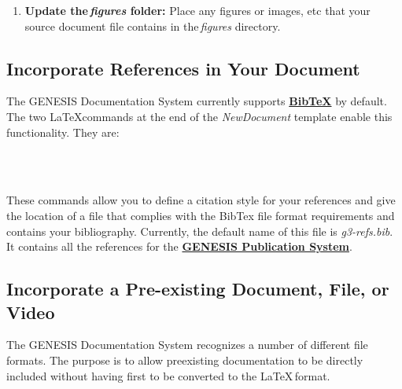 \documentclass[12pt]{article}
\begin{document}
\begin{enumerate}
\begin{enumerate}
Other useful tags include:
\begin{verbatim}
    - genesis2
    - genesis3
    - level1
    - level2
    - level3
    - level4
    - level5
    - level6
    - level7
    - wiki
    - create
    - introduction
    - tutorial
    - document
\end{verbatim}

{\bf Note:} User supplied tags not recognized by the documentation build system may still be useful for local control and sorting of documentation. Importantly, when adding your own tags remember that the interpretation of the\,{\it descriptor.yml} file by the GENESIS Documentation System is sensitive to white space and indents.
 
\end{enumerate}

\item[]{\bf Update the\,{\it figures} folder:} Place any figures or images, etc that your source document file contains in the\,{\it figures} directory.

\end{enumerate}

\subsection*{Incorporate References in Your Document}

The GENESIS Documentation System currently supports \href{http://www.bibtex.org/}{\bf BibTeX} by default. The two \LaTeX commands at the end of the {\it NewDocument} template enable this functionality. They are:
\begin{verbatim}
   
   
\end{verbatim}
These commands allow you to define a citation style for your references and give the location of a file that complies with the BibTex file format requirements and contains your bibliography. Currently, the default name of this file is {\it g3-refs.bib}. It contains all the references for the \href{../publication/publication.tex}{\bf GENESIS Publication System}.

\subsection*{Incorporate a Pre-existing Document, File, or Video}

The GENESIS Documentation System recognizes a number of different file formats. The purpose is to allow preexisting documentation to be directly included without having first to be converted to the \LaTeX\,format.
\end{document}
